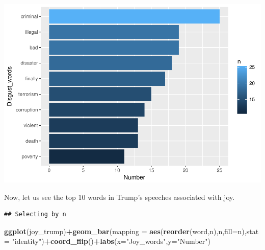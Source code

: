 \documentclass[]{article}
\newenvironment{Shaded}{\begin{snugshade}}{\end{snugshade}}
\newcommand{\KeywordTok}[1]{\textcolor[rgb]{0.13,0.29,0.53}{\textbf{#1}}}
\newcommand{\DataTypeTok}[1]{\textcolor[rgb]{0.13,0.29,0.53}{#1}}
\newcommand{\DecValTok}[1]{\textcolor[rgb]{0.00,0.00,0.81}{#1}}
\newcommand{\StringTok}[1]{\textcolor[rgb]{0.31,0.60,0.02}{#1}}
\newcommand{\OperatorTok}[1]{\textcolor[rgb]{0.81,0.36,0.00}{\textbf{#1}}}
\newcommand{\NormalTok}[1]{#1}
\begin{document}
\includegraphics{Donald_Trump_Speech_sentiment_analysis_files/figure-latex/unnamed-chunk-37-1.pdf}

Now, let us see the top 10 words in Trump's speeches associated with
joy.

\begin{Shaded}
\end{Shaded}

\begin{verbatim}
## Selecting by n
\end{verbatim}

\begin{Shaded}
\begin{Highlighting}[]
\KeywordTok{ggplot}\NormalTok{(joy_trump)}\OperatorTok{+}\KeywordTok{geom_bar}\NormalTok{(}\DataTypeTok{mapping =} \KeywordTok{aes}\NormalTok{(}\KeywordTok{reorder}\NormalTok{(word,n),n,}\DataTypeTok{fill=}\NormalTok{n),}\DataTypeTok{stat =} \StringTok{"identity"}\NormalTok{)}\OperatorTok{+}\KeywordTok{coord_flip}\NormalTok{()}\OperatorTok{+}\KeywordTok{labs}\NormalTok{(}\DataTypeTok{x=}\StringTok{"Joy_words"}\NormalTok{,}\DataTypeTok{y=}\StringTok{"Number"}\NormalTok{)}
\end{Highlighting}
\end{Shaded}
\end{document}

